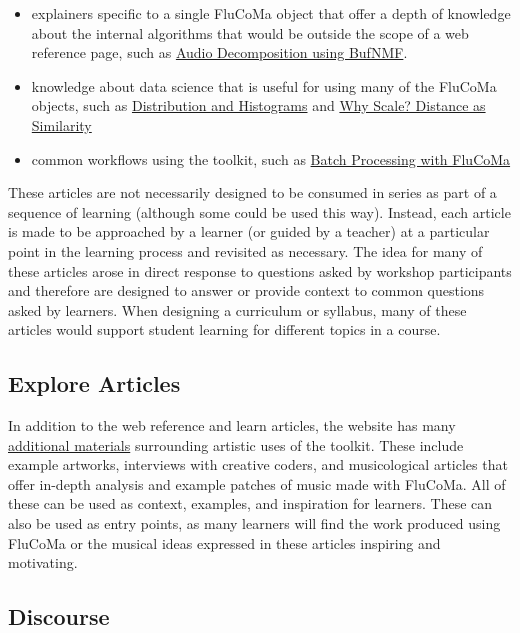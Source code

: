 \documentclass{article}
\providecommand{\tightlist}{%
  \setlength{\itemsep}{0pt}\setlength{\parskip}{0pt}}
\begin{document}
\begin{itemize}
\tightlist
\item
  explainers specific to a single FluCoMa object that offer a depth of
  knowledge about the internal algorithms that would be outside the
  scope of a web reference page, such as
  \href{https://learn.flucoma.org/learn/bufnmf/}{Audio Decomposition
  using BufNMF}.
\item
  knowledge about data science that is useful for using many of the
  FluCoMa objects, such as
  \href{https://learn.flucoma.org/learn/distribution/}{Distribution and
  Histograms} and \href{https://learn.flucoma.org/learn/why-scale/}{Why
  Scale? Distance as Similarity}
\item
  common workflows using the toolkit, such as
  \href{https://learn.flucoma.org/learn/batch-processing/}{Batch
  Processing with FluCoMa}
\end{itemize}

These articles are not necessarily designed to be consumed in series as
part of a sequence of learning (although some could be used this way).
Instead, each article is made to be approached by a learner (or guided
by a teacher) at a particular point in the learning process and
revisited as necessary. The idea for many of these articles arose in
direct response to questions asked by workshop participants and
therefore are designed to answer or provide context to common questions
asked by learners. When designing a curriculum or syllabus, many of these
articles would support student learning for different topics in a
course.

\subsection{Explore Articles}\label{explore-articles}

In addition to the web reference and learn articles, the website has
many \href{https://learn.flucoma.org/explore/}{additional materials}
surrounding artistic uses of the toolkit. These include example
artworks, interviews with creative coders, and musicological articles
that offer in-depth analysis and example patches of music made with
FluCoMa. All of these can be used as context, examples, and inspiration
for learners. These can also be used as entry points, as many learners
will find the work produced using FluCoMa or the musical ideas expressed
in these articles inspiring and motivating.

\subsection{Discourse}\label{discourse}
\end{document}
